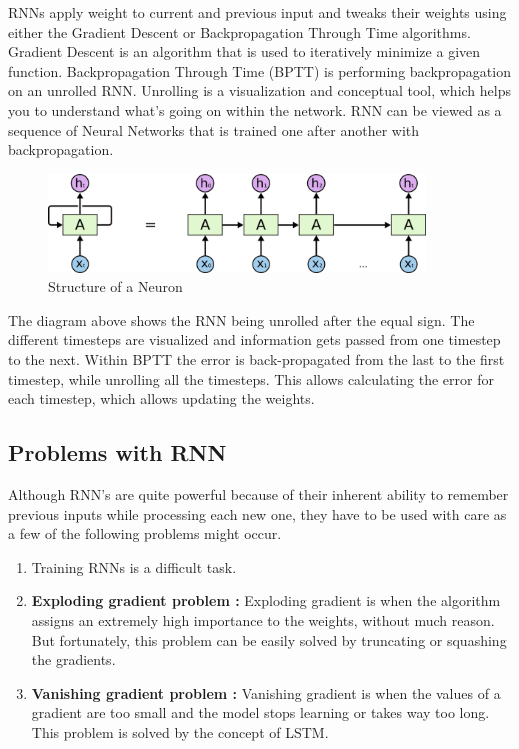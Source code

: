 RNNs apply weight to current and previous input and tweaks their
weights using either the Gradient Descent or Backpropagation Through Time algorithms. Gradient
Descent is an algorithm that is used to iteratively minimize a given function.
Backpropagation Through Time (BPTT) is performing backpropagation on an unrolled RNN. Unrolling is a
visualization and conceptual tool, which helps you to understand what’s going on
within the network. RNN can be viewed as a sequence of Neural Networks that is
trained one after another with backpropagation.

\begin{figure}
	\caption{Structure of a Neuron}
	\centering\includegraphics[width=10cm]{3.png}
\end{figure}

The diagram above shows the RNN being unrolled after the equal sign. The
different timesteps are visualized and information gets passed from one timestep
to the next. Within BPTT the error is back-propagated from the last to the first
timestep, while unrolling all the timesteps. This allows calculating the error
for each timestep, which allows updating the weights.

\subsection{Problems with RNN}
Although RNN's are quite powerful because of their inherent ability to remember previous inputs while processing each new one, they have to be used with care as a few of the following problems might occur. 
\begin{enumerate}[align=left]

	\item Training RNNs is a difficult task.

	\item \textbf{Exploding gradient problem :} Exploding gradient is when
		the algorithm assigns an extremely high importance to the weights,
		without much reason. But fortunately, this problem can be easily
		solved by truncating or squashing the gradients.

	\item \textbf{Vanishing gradient problem :} Vanishing gradient is when
		the values of a gradient are too small and the model stops
		learning or takes way too long. This problem is
		solved by the concept of LSTM.

\end{enumerate}

